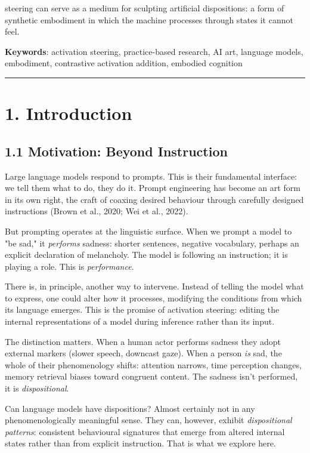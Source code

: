 \documentclass[11pt,a4paper]{article}
\begin{document}
steering can serve as a medium for sculpting artificial dispositions: a form of synthetic embodiment in which the machine processes through states it cannot feel.

\textbf{Keywords}: activation steering, practice-based research, AI art, language models, embodiment, contrastive activation addition, embodied cognition

\bigskip\hrule\bigskip

\section*{1. Introduction}

\subsection*{1.1 Motivation: Beyond Instruction}

Large language models respond to prompts. This is their fundamental interface: we tell them what to do, they do it. Prompt engineering has become an art form in its own right, the craft of coaxing desired behaviour through carefully designed instructions (Brown et al., 2020; Wei et al., 2022).

But prompting operates at the linguistic surface. When we prompt a model to "be sad," it \emph{performs} sadness: shorter sentences, negative vocabulary, perhaps an explicit declaration of melancholy. The model is following an instruction; it is playing a role. This is \emph{performance}.

There is, in principle, another way to intervene. Instead of telling the model what to express, one could alter how it processes, modifying the conditions from which its language emerges. This is the promise of activation steering: editing the internal representations of a model during inference rather than its input.

The distinction matters. When a human actor performs sadness they adopt external markers (slower speech, downcast gaze). When a person \emph{is} sad, the whole of their phenomenology shifts: attention narrows, time perception changes, memory retrieval biases toward congruent content. The sadness isn't performed, it is \emph{dispositional}.

Can language models have dispositions? Almost certainly not in any phenomenologically meaningful sense. They can, however, exhibit \emph{dispositional patterns}: consistent behavioural signatures that emerge from altered internal states rather than from explicit instruction. That is what we explore here.
\end{document}
